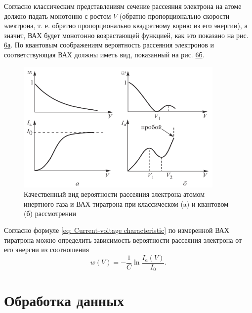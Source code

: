 \documentclass[a4paper,12pt]{article}
\begin{document}
Согласно классическим представлениям сечение рассеяния электрона на атоме должно падать монотонно с ростом $V$ (обратно пропорционально скорости электрона, т. е. обратно пропорционально квадратному корню из его энергии), а значит, ВАХ будет монотонно возрастающей функцией, как это показано на рис. \hyperref[fig: Current-voltage characteristic]{6а}. По квантовым соображениям вероятность рассеяния электронов и соответствующая ВАХ должны иметь вид, показанный на рис. \hyperref[fig: Current-voltage characteristic]{6б}.
\begin{figure}[H]\label{fig: Current-voltage characteristic}
    \centering
    \includegraphics[width = 0.9\textwidth]{Current-voltage characteristic}
    \caption{Качественный вид вероятности рассеяния электрона атомом инертного газа и ВАХ тиратрона при классическом (a) и квантовом (б) рассмотрении}
\end{figure}
Согласно формуле \eqref{eq: Current-voltage characteristic} по измеренной ВАХ тиратрона можно определить зависимость вероятности рассеяния электрона от его энергии из соотношения
\begin{equation}\label{eq: Scattering probability via current}
    w(V) = -\frac{1}{C}\ln\frac{I_a(V)}{I_0}.
\end{equation}

\newpage
\section{Обработка данных}
\end{document}

